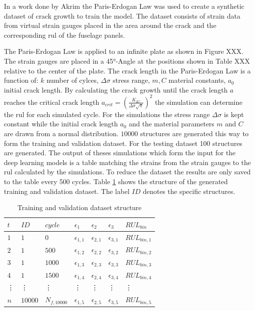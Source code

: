 \documentclass[conference]{IEEEtran}
\begin{document}
In a work done by Akrim \cite{Akrim} the Paris-Erdogan Law \cite{Paris1963} was used to create a synthetic dataset of crack growth to train the model. The dataset consists of strain data from virtual strain gauges placed in the area around the crack and the corresponding \gls{rul} of the fuselage panels.

The Paris-Erdogan Law is applied to an infinite plate as shown in Figure XXX. The strain gauges are placed in a 45°-Angle at the positions shown in Table XXX relative to the center of the plate. The crack length in the Paris-Erdogan Law is a function of: $k$ number of cylces, $\Delta \sigma$ stress range, $m, C$ material constants, $a_0$ initial crack length. By calculating the crack growth until the crack length $a$ reaches the critical crack length $a_{crit}=(\frac{K_{IC}}{\Delta \sigma \sqrt{\pi}})^2$ the simulation can determine the \gls{rul} for each simulated cycle. For the simulations the stress range $\Delta \sigma$ is kept constant while the initial crack length $a_0$ and the material parameters $m$ and $C$ are drawn from a normal distribution. $ 10000 $ structures are generated this way to form the training and validation dataset. For the testing dataset 100 structures are generated. The output of theses simulations which form the input for the deep learning models is a table matching the strains from the strain gauges to the \gls{rul} calculated by the simulations. To reduce the dataset the results are only saved to the table every 500 cycles. Table \ref{tab:sliding_window_approach} shows the structure of the generated training and validation dataset. The label $ ID $ denotes the specific structures.

\begin{table}[htp]
	\centering
	\caption{Training and validation dataset structure}
	\label{tab:sliding_window_approach}
	\begin{tabular}{lllllll}
		$ t $ & $ ID $ & $ cycle $ & $ \epsilon_1 $     & $ \epsilon_2 $     & $ \epsilon_3 $     & $ RUL_{bin} $   \\
		\hline
		$ 1 $ & $ 1 $  & $ 0 $     & $ \epsilon_{1,1} $ & $ \epsilon_{2,1} $ &  $ \epsilon_{3,1} $ &  $ RUL_{bin,1} $ \\
		$ 2 $ & $ 1 $  & $ 500 $   & $ \epsilon_{1,2} $ & $ \epsilon_{2,2} $ & $ \epsilon_{3,2} $ & $ RUL_{bin,2} $ \\
		$ 3 $ & $ 1 $  & $ 1000 $  & $ \epsilon_{1,3} $ & $ \epsilon_{2,3} $ & $ \epsilon_{3,3} $ & $ RUL_{bin,3} $ \\
		$ 4 $ & $ 1 $  & $ 1500 $  & $ \epsilon_{1,4} $ & $ \epsilon_{2,4} $ & $ \epsilon_{3,4} $ & $ RUL_{bin,4} $ \\
		\vdots & \vdots & \vdots & \vdots & \vdots &\vdots & \vdots \\
		$ n $ & $ 10000 $  & $ N_{f,10000} $  & $ \epsilon_{1,5} $ & $ \epsilon_{2,5} $ & $ \epsilon_{3,5} $ & $ RUL_{bin,5} $
	\end{tabular}
\end{table}
\end{document}
